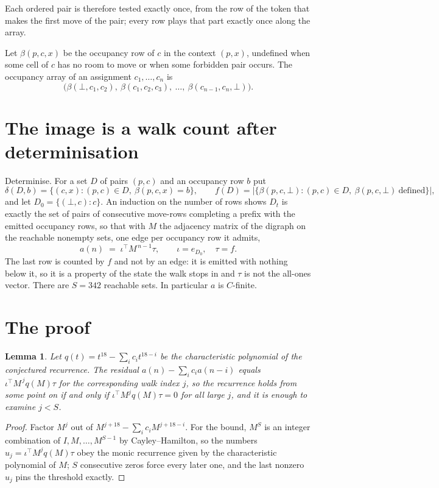 \documentclass[11pt,a4paper]{article}
\theoremstyle{plain}
\newtheorem{lemma}[theorem]{Lemma}
\theoremstyle{definition}
\begin{document}
Each ordered pair is therefore tested exactly once, from the row of the token that makes the
first move of the pair; every row plays that part exactly once along the array.

Let $\beta(p,c,x)$ be the occupancy row of $c$ in the context $(p,x)$, undefined when some
cell of $c$ has no room to move or when some forbidden pair occurs. The occupancy array of an
assignment $c_1,\dots,c_n$ is
\[
\bigl(\beta(\bot,c_1,c_2),\ \beta(c_1,c_2,c_3),\ \dots,\ \beta(c_{n-1},c_n,\bot)\bigr).
\]

\section{The image is a walk count after determinisation}

Determinise. For a set $D$ of pairs $(p,c)$ and an occupancy row $b$ put
\[
\delta(D,b)=\{(c,x):(p,c)\in D,\ \beta(p,c,x)=b\},\qquad
f(D)=\bigl|\{\beta(p,c,\bot):(p,c)\in D,\ \beta(p,c,\bot)\ \text{defined}\}\bigr| ,
\]
and let $D_0=\{(\bot,c):c\}$. An induction on the number of rows shows $D_t$ is exactly the
set of pairs of consecutive move-rows completing a prefix with the emitted occupancy rows, so
that with $M$ the adjacency matrix of the digraph on the reachable nonempty sets, one edge per
occupancy row it admits,
\[
a(n)\;=\;\iota^{\!\top}M^{\,n-1}\tau,\qquad \iota=e_{D_0},\quad \tau=f .
\]
The last row is counted by $f$ and not by an edge: it is emitted with nothing below it, so it
is a property of the state the walk stops in and $\tau$ is not the all-ones vector. There are
$S=342$ reachable sets. In particular $a$ is $C$-finite.

\section{The proof}

\begin{lemma}\label{lem:crit}
Let $q(t)=t^{18}-\sum_i c_it^{18-i}$ be the characteristic polynomial of the
conjectured recurrence. The residual $a(n)-\sum_ic_ia(n-i)$ equals
$\iota^{\!\top}M^{\,j}q(M)\tau$ for the corresponding walk index $j$, so the recurrence
holds from some point on if and only if $\iota^{\!\top}M^{j}q(M)\tau=0$ for all large $j$,
and it is enough to examine $j<S$.
\end{lemma}

\begin{proof}
Factor $M^{j}$ out of $M^{j+18}-\sum_ic_iM^{j+18-i}$. For the bound, $M^{S}$
is an integer combination of $I,M,\dots,M^{S-1}$ by Cayley--Hamilton, so the numbers
$u_j=\iota^{\!\top}M^{j}q(M)\tau$ obey the monic recurrence given by the characteristic
polynomial of $M$; $S$ consecutive zeros force every later one, and the last nonzero $u_j$
pins the threshold exactly.
\end{proof}
\end{document}

